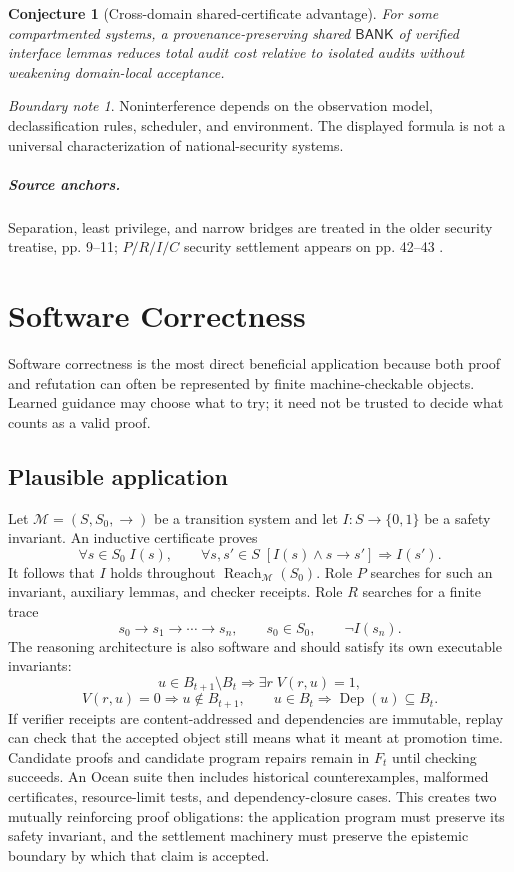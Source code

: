 \documentclass[11pt,oneside]{book}
\newtheorem{conjecture}[theorem]{Conjecture}
\theoremstyle{definition}
\theoremstyle{remark}
\newtheorem{boundary}[theorem]{Boundary note}
\newcommand{\BANK}{\mathsf{BANK}}
\newcommand{\Reach}{\operatorname{Reach}}
\newcommand{\Dep}{\operatorname{Dep}}
\begin{document}
\begin{conjecture}[Cross-domain shared-certificate advantage]
For some compartmented systems, a provenance-preserving shared \(\BANK\) of verified interface
lemmas reduces total audit cost relative to isolated audits without weakening domain-local acceptance.
\end{conjecture}

\begin{boundary}
Noninterference depends on the observation model, declassification rules, scheduler, and environment.
The displayed formula is not a universal characterization of national-security systems.
\end{boundary}

\paragraph{Source anchors.} Separation, least privilege, and narrow bridges are treated in the older
security treatise, pp. 9--11; $P/R/I/C$ security settlement appears on pp. 42--43
\cite{TennesonSecurity}.

\chapter{Software Correctness}
\label{ch:software}

Software correctness is the most direct beneficial application because both proof and refutation can
often be represented by finite machine-checkable objects. Learned guidance may choose what to try;
it need not be trusted to decide what counts as a valid proof.

\section{Plausible application}
Let \(\mathcal M=(S,S_0,\to)\) be a transition system and let \(I:S\to\{0,1\}\) be a safety
invariant. An inductive certificate proves
\[
\forall s\in S_0\;I(s),
\qquad
\forall s,s'\in S\;[I(s)\land s\to s']\Rightarrow I(s').
\]
It follows that \(I\) holds throughout \(\Reach_{\mathcal M}(S_0)\). Role \(P\) searches for such an
invariant, auxiliary lemmas, and checker receipts. Role \(R\) searches for a finite trace
\[
s_0\to s_1\to\cdots\to s_n,
\qquad s_0\in S_0,
\qquad \neg I(s_n).
\]
The reasoning architecture is also software and should satisfy its own executable invariants:
\[
u\in B_{t+1}\setminus B_t
\Rightarrow\exists r\;V(r,u)=1,
\]
\[
V(r,u)=0\Rightarrow u\notin B_{t+1},
\qquad
u\in B_t\Rightarrow\Dep(u)\subseteq B_t.
\]
If verifier receipts are content-addressed and dependencies are immutable, replay can check that
the accepted object still means what it meant at promotion time. Candidate proofs and candidate
program repairs remain in \(F_t\) until checking succeeds. An Ocean suite then includes historical
counterexamples, malformed certificates, resource-limit tests, and dependency-closure cases. This
creates two mutually reinforcing proof obligations: the application program must preserve its safety
invariant, and the settlement machinery must preserve the epistemic boundary by which that claim is
accepted.
\end{document}
